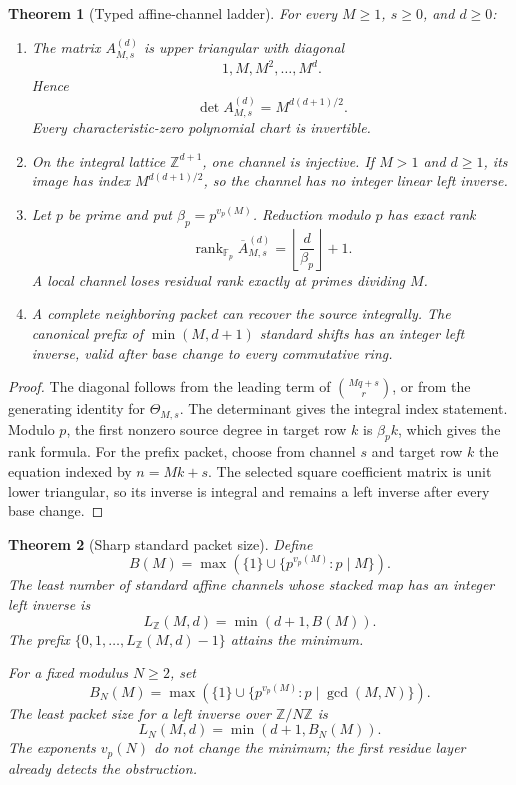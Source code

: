 \documentclass[11pt]{article}
\newtheorem{theorem}{Theorem}[section]
\theoremstyle{definition}
\theoremstyle{remark}
\DeclareMathOperator{\rank}{rank}
\begin{document}
\begin{theorem}[Typed affine-channel ladder]
\label{thm:block08-channel-ladder}
For every \(M\geq1\), \(s\geq0\), and \(d\geq0\):
\begin{enumerate}
\item The matrix \(A_{M,s}^{(d)}\) is upper triangular with diagonal
\[
 1,M,M^2,\ldots,M^d.
\]
Hence
\[
 \boxed{\det A_{M,s}^{(d)}=M^{d(d+1)/2}.}
\]
Every characteristic-zero polynomial chart is invertible.
\item On the integral lattice \(\mathbb Z^{d+1}\), one channel is injective.  If \(M>1\) and \(d\geq1\), its image has index \(M^{d(d+1)/2}\), so the channel has no integer linear left inverse.
\item Let \(p\) be prime and put \(\beta_p=p^{v_p(M)}\).  Reduction modulo \(p\) has exact rank
\[
 \boxed{
 \rank_{\mathbb F_p}\overline A_{M,s}^{(d)}
 =\left\lfloor\frac d{\beta_p}\right\rfloor+1.}
\]
A local channel loses residual rank exactly at primes dividing \(M\).
\item A complete neighboring packet can recover the source integrally.  The canonical prefix of \(\min(M,d+1)\) standard shifts has an integer left inverse, valid after base change to every commutative ring.
\end{enumerate}
\end{theorem}

\begin{proof}
The diagonal follows from the leading term of \(\binom{Mq+s}{r}\), or from the generating identity for \(\Theta_{M,s}\).  The determinant gives the integral index statement.  Modulo \(p\), the first nonzero source degree in target row \(k\) is \(\beta_pk\), which gives the rank formula.  For the prefix packet, choose from channel \(s\) and target row \(k\) the equation indexed by \(n=Mk+s\).  The selected square coefficient matrix is unit lower triangular, so its inverse is integral and remains a left inverse after every base change.
\end{proof}

\begin{theorem}[Sharp standard packet size]
\label{thm:block08-sharp-packet}
Define
\[
 B(M)
 =
 \max\left(\{1\}\cup\{p^{v_p(M)}:p\mid M\}\right).
\]
The least number of standard affine channels whose stacked map has an integer left inverse is
\[
 \boxed{L_{\mathbb Z}(M,d)=\min(d+1,B(M)).}
\]
The prefix \(\{0,1,\ldots,L_{\mathbb Z}(M,d)-1\}\) attains the minimum.

For a fixed modulus \(N\geq2\), set
\[
 B_N(M)
 =
 \max\left(\{1\}\cup
 \{p^{v_p(M)}:p\mid\gcd(M,N)\}\right).
\]
The least packet size for a left inverse over \(\mathbb Z/N\mathbb Z\) is
\[
 \boxed{L_N(M,d)=\min(d+1,B_N(M)).}
\]
The exponents \(v_p(N)\) do not change the minimum; the first residue layer already detects the obstruction.
\end{theorem}
\end{document}
